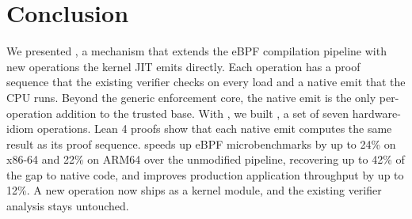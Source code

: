 


\section{Conclusion}
\label{sec:conclusion}

We presented \tool, a mechanism that extends the eBPF compilation pipeline with new operations the kernel JIT emits directly.
Each operation has a proof sequence that the existing verifier checks on every load and a native emit that the CPU runs.
Beyond the generic enforcement core, the native emit is the only per-operation addition to the trusted base.
With \tool, we built \lang, a set of seven hardware-idiom operations.
Lean 4 proofs show that each \lang native emit computes the same result as its proof sequence.
\lang speeds up eBPF microbenchmarks by up to 24\% on x86-64 and 22\% on ARM64 over the unmodified pipeline, recovering up to 42\% of the gap to native code, and improves production application throughput by up to 12\%.
A new operation now ships as a kernel module, and the existing verifier analysis stays untouched.

